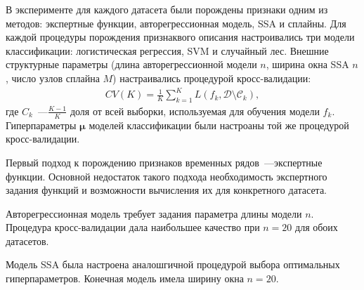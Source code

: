 \documentclass{llncs}
\begin{document}
В эксперименте для каждого датасета были порождены признаки одним из методов: экспертные функции, авторегрессионная модель, SSA и сплайны.
Для каждой процедуры порождения признаквого описания настроивались три модели классификации: логистическая регрессия, SVM и случайный лес.
Внешние структурные параметры (длина авторегрессионной модели $n$, ширина окна SSA $n$, число узлов сплайна $M$) настраивались процедурой кросс-валидации:
\begin{align}\label{cv}
CV(K) = \frac{1}{K}\sum_{k=1}^{K} L(f_k, \mathcal{D}\setminus \mathcal{C}_k),
\end{align}
где $C_k$~---$\frac{K-1}{K}$ доля от всей выборки, используемая для обучения модели $f_k$.
Гиперпараметры $\bm{\mu}$ моделей классификации были настроаны той же процедурой кросс-валидации.

Первый подход к порождению признаков временных рядов~---экспертные функции.
Основной недостаток такого подхода необходимость экспертного задания функций	 и возможности вычисления их для конкретного датасета.

Авторегрессионная модель требует задания параметра длины модели $n$. 
Процедура кросс-валидации дала наибольшее качество при $n=20$ для обоих датасетов.

Модель SSA была настроена аналошгичной процедурой выбора оптимальных гиперпараметров. Конечная модель имела ширину окна $n=20$.
\end{document}
